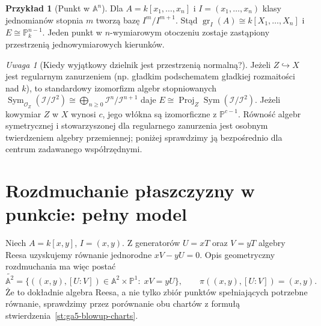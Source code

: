 \documentclass[11pt,a4paper,openany]{report}
\numberwithin{equation}{section}
\theoremstyle{plain}
\theoremstyle{definition}
\newtheorem{przyklad}[twierdzenie]{Przykład}
\theoremstyle{remark}
\newtheorem{uwaga}[twierdzenie]{Uwaga}
\newcommand{\A}{\mathbb A}
\newcommand{\PP}{\mathbb P}
\begin{document}
\begin{przyklad}[Punkt w $\A^n$]
Dla $A=k[x_1,\ldots,x_n]$ i
$I=(x_1,\ldots,x_n)$ klasy jednomianów stopnia $m$
tworzą bazę $I^m/I^{m+1}$. Stąd
$\operatorname{gr}_I(A)\cong k[X_1,\ldots,X_n]$
i $E\cong\PP^{n-1}_k$.
Jeden punkt w $n$-wymiarowym otoczeniu zostaje
zastąpiony przestrzenią jednowymiarowych kierunków.
\end{przyklad}

\begin{uwaga}[Kiedy wyjątkowy dzielnik jest przestrzenią normalną?]
Jeżeli $Z\hookrightarrow X$ jest regularnym zanurzeniem
(np. gładkim podschematem gładkiej rozmaitości nad $k$),
to standardowy izomorfizm algebr stopniowanych
$\operatorname{Sym}_{\mathcal O_Z}(\mathcal I/\mathcal I^2)
\cong\bigoplus_{n\ge0}\mathcal I^n/\mathcal I^{n+1}$
daje
$E\cong\operatorname{Proj}_Z
\operatorname{Sym}(\mathcal I/\mathcal I^2)$.
Jeżeli kowymiar $Z$ w $X$ wynosi $c$, jego włókna są
izomorficzne z $\PP^{c-1}$. Równość algebr
symetrycznej i stowarzyszonej dla regularnego zanurzenia
jest osobnym twierdzeniem algebry przemiennej;
poniżej sprawdzimy ją bezpośrednio dla centrum
zadawanego współrzędnymi.
\end{uwaga}

\section{Rozdmuchanie płaszczyzny w punkcie: pełny model}
\label{sec:ga5-plane}

Niech $A=k[x,y]$, $I=(x,y)$. Z generatorów
$U=xT$ oraz $V=yT$ algebry Reesa uzyskujemy
równanie jednorodne $xV-yU=0$. Opis geometryczny
rozdmuchania ma więc postać
\[
 \widetilde{\A^2}
 =\{((x,y),[U:V])\in\A^2\times\PP^1:\;xV=yU\},
 \qquad \pi((x,y),[U:V])=(x,y).
\]
Że to dokładnie algebra Reesa, a nie tylko zbiór
punktów spełniających potrzebne równanie, sprawdzimy
przez porównanie obu chartów z formułą
stwierdzenia~\ref{st:ga5-blowup-charts}.
\end{document}
